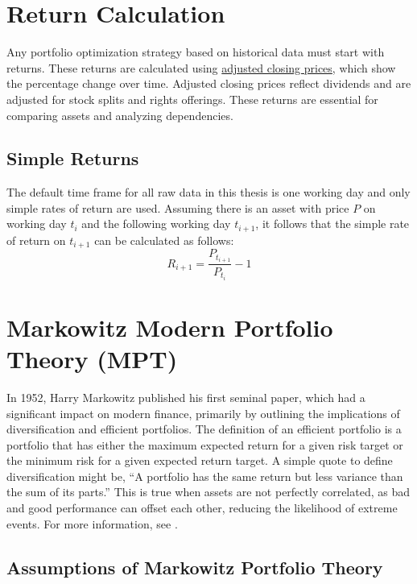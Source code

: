 \documentclass[
  oneside]{book}
\begin{document}
\hypertarget{return-calculation}{%
\section{Return Calculation}\label{return-calculation}}

Any portfolio optimization strategy based on historical data must start with returns. These returns are calculated using \href{https://www.investopedia.com/terms/a/adjusted\%20closingprice.asp}{adjusted closing prices}, which show the percentage change over time. Adjusted closing prices reflect dividends and are adjusted for stock splits and rights offerings. These returns are essential for comparing assets and analyzing dependencies.

\hypertarget{simple-returns}{%
\subsection{Simple Returns}\label{simple-returns}}

The default time frame for all raw data in this thesis is one working day and only simple rates of return are used. Assuming there is an asset with price \(P\) on working day \(t_i\) and the following working day \(t_{i+1}\), it follows that the simple rate of return on \(t_{i+1}\) can be calculated as follows:
\[
  R_{i+1} = \frac{P_{t_{i+1}}}{P_{t_i}}-1
\]

\hypertarget{markowitz-modern-portfolio-theory-mpt}{%
\section{Markowitz Modern Portfolio Theory (MPT)}\label{markowitz-modern-portfolio-theory-mpt}}

In 1952, Harry Markowitz published his first seminal paper, which had a significant impact on modern finance, primarily by outlining the implications of diversification and efficient portfolios. The definition of an efficient portfolio is a portfolio that has either the maximum expected return for a given risk target or the minimum risk for a given expected return target. A simple quote to define diversification might be, ``A portfolio has the same return but less variance than the sum of its parts.'' This is true when assets are not perfectly correlated, as bad and good performance can offset each other, reducing the likelihood of extreme events. For more information, see \citep{Mari2005}.

\hypertarget{assumptions-of-markowitz-portfolio-theory}{%
\subsection{Assumptions of Markowitz Portfolio Theory}\label{assumptions-of-markowitz-portfolio-theory}}
\end{document}
